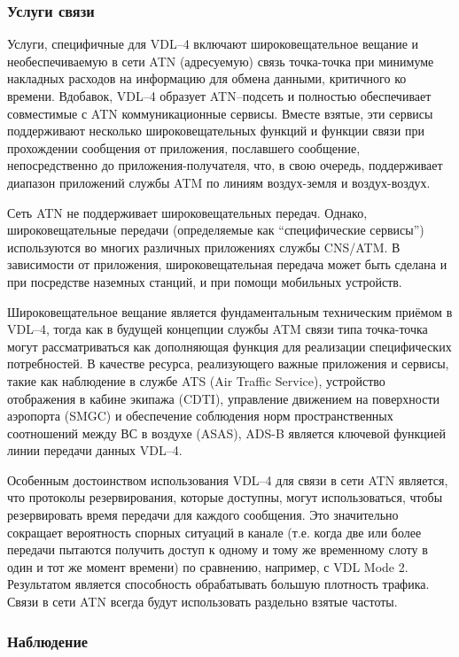 \documentclass[a4paper,12pt]{report} %
\begin{document}
\subsubsection{Услуги связи}

Услуги, специфичные для VDL--4 включают широковещательное вещание и
необеспечиваемую в сети ATN (адресуемую) связь точка-точка при минимуме
накладных расходов на информацию для обмена данными, критичного ко времени.
Вдобавок, VDL--4 образует ATN--подсеть и полностью обеспечивает совместимые с
ATN коммуникационные сервисы. Вместе взятые, эти сервисы поддерживают несколько
широковещательных функций и функции связи при прохождении сообщения от 
приложения, пославшего сообщение, непосредственно до приложения-получателя, что,
в свою очередь, поддерживает диапазон приложений службы ATM по линиям
воздух-земля и воздух-воздух. 

Сеть ATN не поддерживает широковещательных передач. Однако, широковещательные
передачи (определяемые как ``специфические сервисы'') используются во многих различных
приложениях службы CNS/ATM. В зависимости от приложения, широковещательная передача
может быть сделана и при посредстве наземных станций, и при помощи мобильных устройств.

Широковещательное вещание является фундаментальным техническим приёмом в VDL--4,
тогда как в будущей концепции службы ATM связи типа точка-точка могут
рассматриваться как дополняющая функция для реализации специфических
потребностей. В качестве ресурса, реализующего важные приложения и сервисы,
такие как наблюдение в службе ATS (Air Traffic Service), устройство отображения
в кабине экипажа (CDTI), управление движением на поверхности аэропорта (SMGC) и
обеспечение соблюдения норм пространственных соотношений между ВС в воздухе
(ASAS), ADS-B является ключевой функцией линии передачи данных VDL--4.  

Особенным достоинством использования VDL--4 для связи в сети ATN является, что
протоколы резервирования, которые доступны, могут использоваться, чтобы
резервировать время передачи для каждого сообщения. Это значительно сокращает
вероятность спорных ситуаций в канале (т.е. когда две или более передачи
пытаются получить доступ к одному и тому же временному слоту в один и тот же
момент времени) по сравнению, например, с VDL Mode 2. Результатом является
способность обрабатывать большую плотность трафика. Связи в сети ATN всегда
будут использовать раздельно взятые частоты.  

\subsubsection{Наблюдение}
\end{document}
